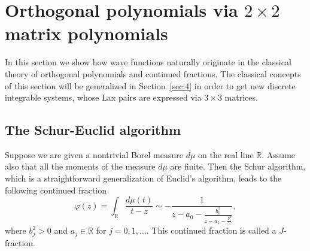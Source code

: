 \documentclass{amsart}
\theoremstyle{remark}
\numberwithin{equation}{section}
\begin{document}
\section{Orthogonal polynomials via $2\times 2$ matrix polynomials}\label{sec:3}

In this section we show how wave functions naturally originate in the classical theory of orthogonal polynomials and continued fractions. The classical concepts of this section will be generalized in Section~\ref{sec:4} in order to get new  discrete integrable systems, whose Lax pairs are expressed via $3\times 3$ matrices.

\subsection{The Schur-Euclid algorithm}\label{sec:31}

Suppose we are given a nontrivial Borel measure $d\mu$ on the real line ${{\mathbb R}}$. Assume also that all the moments of the measure $d\mu$
are finite. Then the Schur algorithm, which is a straightforward generalization of Euclid's algorithm, leads
to the following continued fraction
\[
\varphi(z)=\int_{{\mathbb R}}\frac{d\mu(t)}{t-z}\sim
-\frac{1}{\displaystyle{z-a_0-\frac{b_0^2}{\displaystyle{z-a_1-\frac{b_1^2}{\ddots}}}}},
\]
where $b_j^2>0$ and $a_j\in{{\mathbb R}}$ for $j=0,1,\dots$. This continued fraction is called a $J$-fraction.
\end{document}
